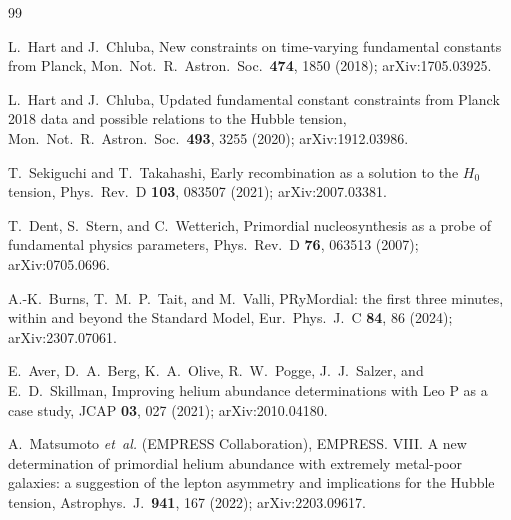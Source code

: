 \documentclass[aps,prd,twocolumn,superscriptaddress,nofootinbib,10pt]{revtex4-2}
\begin{document}
\begin{thebibliography}{99}

L.~Hart and J.~Chluba,
New constraints on time-varying fundamental constants from Planck,
Mon.\ Not.\ R.\ Astron.\ Soc.\ \textbf{474}, 1850 (2018);
arXiv:1705.03925.

L.~Hart and J.~Chluba,
Updated fundamental constant constraints from Planck 2018 data and possible relations to the
Hubble tension,
Mon.\ Not.\ R.\ Astron.\ Soc.\ \textbf{493}, 3255 (2020);
arXiv:1912.03986.

T.~Sekiguchi and T.~Takahashi,
Early recombination as a solution to the $H_0$ tension,
Phys.\ Rev.\ D \textbf{103}, 083507 (2021);
arXiv:2007.03381.

T.~Dent, S.~Stern, and C.~Wetterich,
Primordial nucleosynthesis as a probe of fundamental physics parameters,
Phys.\ Rev.\ D \textbf{76}, 063513 (2007);
arXiv:0705.0696.

A.-K.~Burns, T.~M.~P.~Tait, and M.~Valli,
PRyMordial: the first three minutes, within and beyond the Standard Model,
Eur.\ Phys.\ J.\ C \textbf{84}, 86 (2024);
arXiv:2307.07061.

E.~Aver, D.~A.~Berg, K.~A.~Olive, R.~W.~Pogge, J.~J.~Salzer, and E.~D.~Skillman,
Improving helium abundance determinations with Leo P as a case study,
JCAP \textbf{03}, 027 (2021);
arXiv:2010.04180.

A.~Matsumoto \emph{et~al.} (EMPRESS Collaboration),
EMPRESS. VIII. A new determination of primordial helium abundance with extremely metal-poor
galaxies: a suggestion of the lepton asymmetry and implications for the Hubble tension,
Astrophys.\ J.\ \textbf{941}, 167 (2022);
arXiv:2203.09617.

\end{thebibliography}
\end{document}
